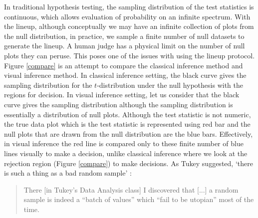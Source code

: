 \documentclass[12]{article}
\begin{document}
In traditional hypothesis testing, the sampling distribution of the test statistics is continuous, which allows evaluation of probability on an infinite spectrum. With the lineup, although conceptually we may have an infinite collection of plots from the null distribution, in practice, we sample a finite number of null datasets to generate the lineup. A human judge has a physical limit on the number of null plots they can peruse. This poses one of the issues with using the lineup protocol.  Figure \ref{compare} is an attempt to compare the classical inference method and visual inference method. In classical inference setting, the black curve  gives the sampling distribution for the $t$-distribution under the null hypothesis with the regions for decision. In visual inference setting, let us consider that the black curve gives the sampling distribution although the sampling distribution is essentially a distribution of null plots. Although the test statistic is not numeric, the true data plot which is the test statistic is represented using red bar and the null plots that are drawn from the null distribution are the blue bars. %
Effectively,  in visual inference the red line is compared only to these finite number of blue lines visually to make a decision, unlike classical inference where we look at the rejection region (Figure \ref{compare}) to make decisions. As Tukey suggested, `there is such a thing as a bad random sample' \citep{fernholz03}:

\begin{quotation}
There [in Tukey's Data Analysis class] I discovered that [...]  a random sample is indeed a ``batch of values'' which ``fail to be utopian'' most of the time.
\end{quotation}
\end{document}
